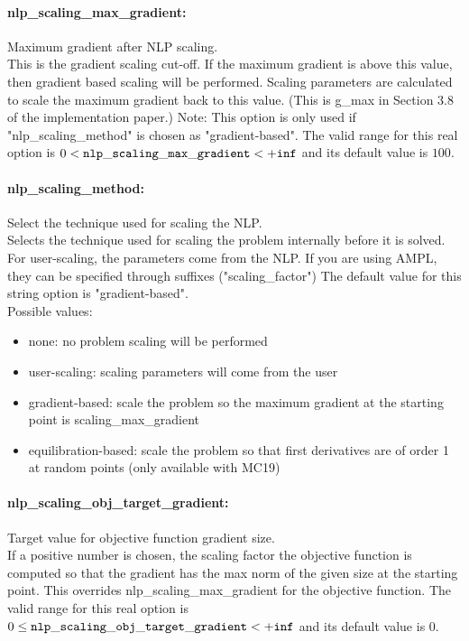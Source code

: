 \paragraph{nlp\_scaling\_max\_gradient:}\label{sec:nlp_scaling_max_gradient} Maximum gradient after NLP scaling. $\;$ \\
 This is the gradient scaling cut-off. If the
maximum gradient is above this value, then
gradient based scaling will be performed. Scaling
parameters are calculated to scale the maximum
gradient back to this value. (This is g\_max in
Section 3.8 of the implementation paper.) Note:
This option is only used if
"nlp\_scaling\_method" is chosen as
"gradient-based". The valid range for this real option is 
$0 <  {\tt nlp\_scaling\_max\_gradient } <  {\tt +inf}$
and its default value is $100$.


\paragraph{nlp\_scaling\_method:}\label{sec:nlp_scaling_method} Select the technique used for scaling the NLP. $\;$ \\
 Selects the technique used for scaling the
problem internally before it is solved. For
user-scaling, the parameters come from the NLP.
If you are using AMPL, they can be specified
through suffixes ("scaling\_factor")
The default value for this string option is "gradient-based".
\\ 
Possible values:
\begin{itemize}
   \item none: no problem scaling will be performed
   \item user-scaling: scaling parameters will come from the user
   \item gradient-based: scale the problem so the maximum gradient at
the starting point is scaling\_max\_gradient
   \item equilibration-based: scale the problem so that first derivatives are
of order 1 at random points (only available
with MC19)
\end{itemize}

\paragraph{nlp\_scaling\_obj\_target\_gradient:}\label{sec:nlp_scaling_obj_target_gradient} Target value for objective function gradient size. $\;$ \\
 If a positive number is chosen, the scaling
factor the objective function is computed so that
the gradient has the max norm of the given size
at the starting point.  This overrides
nlp\_scaling\_max\_gradient for the objective
function. The valid range for this real option is 
$0 \le {\tt nlp\_scaling\_obj\_target\_gradient } <  {\tt +inf}$
and its default value is $0$.


